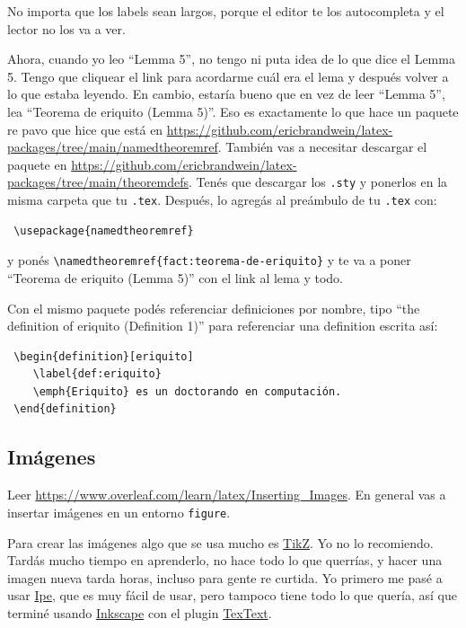 \documentclass{article}
\begin{document}
No importa que los labels sean largos, porque el editor te los autocompleta y el lector no los va a ver.

Ahora, cuando yo leo ``Lemma 5'', no tengo ni puta idea de lo que dice el Lemma 5. Tengo que cliquear el link para acordarme cuál era el lema y después volver a lo que estaba leyendo. En cambio, estaría bueno que en vez de leer ``Lemma 5'', lea ``Teorema de eriquito (Lemma 5)''. Eso es exactamente lo que hace un paquete re pavo que hice que está en \url{https://github.com/ericbrandwein/latex-packages/tree/main/namedtheoremref}. También vas a necesitar descargar el paquete en \url{https://github.com/ericbrandwein/latex-packages/tree/main/theoremdefs}.
Tenés que descargar los \texttt{.sty} y ponerlos en la misma carpeta que tu \texttt{.tex}. Después, lo agregás al preámbulo de tu \texttt{.tex} con:
\begin{verbatim}
 \usepackage{namedtheoremref}
\end{verbatim}

y ponés \verb|\namedtheoremref{fact:teorema-de-eriquito}| y te va a poner ``Teorema de eriquito (Lemma 5)'' con el link al lema y todo.

Con el mismo paquete podés referenciar definiciones por nombre, tipo ``the definition of eriquito (Definition 1)'' para referenciar una definition escrita así:


\begin{verbatim}
 \begin{definition}[eriquito]
    \label{def:eriquito}
    \emph{Eriquito} es un doctorando en computación.
 \end{definition}
\end{verbatim}

\subsection{Imágenes}
Leer \url{https://www.overleaf.com/learn/latex/Inserting_Images}. En general vas a insertar imágenes en un entorno \texttt{figure}.

Para crear las imágenes algo que se usa mucho es \href{https://www.overleaf.com/learn/latex/TikZ_package}{TikZ}. Yo no lo recomiendo. Tardás mucho tiempo en aprenderlo, no hace todo lo que querrías, y hacer una imagen nueva tarda horas, incluso para gente re curtida. Yo primero me pasé a usar \href{https://ipe.otfried.org/}{Ipe}, que es muy fácil de usar, pero tampoco tiene todo lo que quería, así que terminé usando \href{https://inkscape.org/}{Inkscape} con el plugin \href{https://textext.github.io/textext/}{TexText}.
\end{document}
